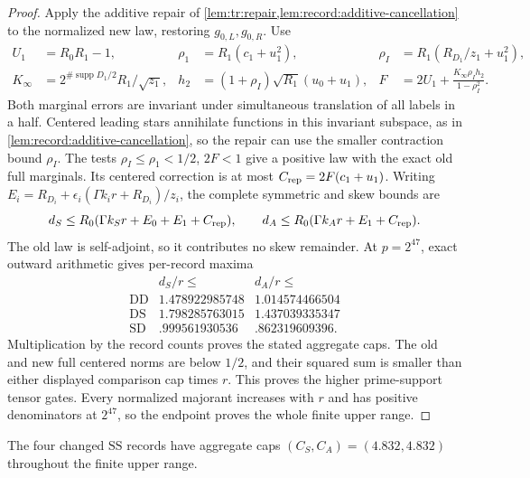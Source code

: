 \begin{proof}
Apply the additive repair of \cref{lem:tr:repair,lem:record:additive-cancellation}
to the normalized new law, restoring $g_{0,L},g_{0,R}$. Use
\begin{align*}
 U_1&=R_0R_1-1,&
 \rho_1&=R_1(c_1+u_1^2),&
 \rho_I&=R_1(R_{D_1}/z_1+u_1^2),\\
 K_\infty&=2^{\#\operatorname{supp}D_1/2}R_1/\sqrt{z_1},&
 h_2&=(1+\rho_I)\sqrt{R_1}(u_0+u_1),&
 F&=2U_1+\frac{K_\infty\rho_Ih_2}{1-\rho_I^2}.
\end{align*}
Both marginal errors are invariant under simultaneous translation
of all labels in a half. Centered leading stars annihilate functions
in this invariant subspace, as in \cref{lem:record:additive-cancellation},
so the repair can use the smaller contraction bound $\rho_I$.
The tests $\rho_I\le\rho_1<1/2$, $2F<1$ give a positive law with
the exact old full marginals. Its centered correction is at most
$C_{\rm rep}=2F(c_1+u_1)$.
Writing $E_i=R_{D_i}+\epsilon_i(\Gamma k_ir+R_{D_i})/z_i$, the
complete symmetric and skew bounds are
\[
 d_S\le R_0(\Gamma k_Sr+E_0+E_1+C_{\rm rep}),\qquad
 d_A\le R_0(\Gamma k_Ar+E_1+C_{\rm rep}).
\]
The old law is self-adjoint, so it contributes no skew remainder.
At $p=2^{47}$, exact outward arithmetic gives per-record maxima
\[
\begin{array}{c|cc}
 &d_S/r\le&d_A/r\le\\ \hline
\mathrm{DD}&1.478922985748&1.014574466504\\
\mathrm{DS}&1.798285763015&1.437039335347\\
\mathrm{SD}&.999561930536&.862319609396.
\end{array}
\]
Multiplication by the record counts proves the stated aggregate caps.
The old and new full centered norms are below $1/2$, and their squared
sum is smaller than either displayed comparison cap times $r$.
This proves the higher prime-support tensor gates. Every normalized
majorant increases with $r$ and has positive denominators at $2^{47}$,
so the endpoint proves the whole finite upper range.
\end{proof}

\begin{proposition}\label{prop:upper-ss-six}
The four changed $\mathrm{SS}$ records have aggregate caps
$(C_S,C_A)=(4.832,4.832)$ throughout the finite upper range.
\end{proposition}

